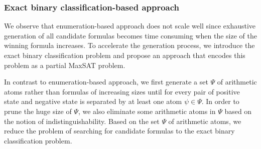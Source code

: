 \documentclass[review]{elsarticle}
\newcommand{\positiveSet}{\mathcal{P}}
\newcommand{\negativeSet}{\mathcal{N}}
\newcommand\ie{{\it i.e.}}
\newcommand{\featureSet}{\Psi}
\begin{document}


	\subsubsection{Exact binary classification-based approach}
	We observe that enumeration-based approach does not scale well since exhaustive generation of all candidate formulas becomes time consuming when the size of the winning formula increases.
	To accelerate the generation process, we introduce the exact binary classification problem and propose an approach that encodes this problem as a partial MaxSAT problem.

	In contrast to enumeration-based approach, we first generate a set $\featureSet$ of arithmetic atoms rather than formulas of increasing sizes until for every pair of positive state and negative state is separated by at least one atom $\psi \in \featureSet$. %
	In order to prune the huge size of $\featureSet$, we also eliminate some arithmetic atoms in $\featureSet$ based on the notion of indistinguishability. 
	Based on the set $\featureSet$ of arithmetic atoms, we reduce the problem of searching for candidate formulas to the exact binary classification problem.
	
\end{document}
